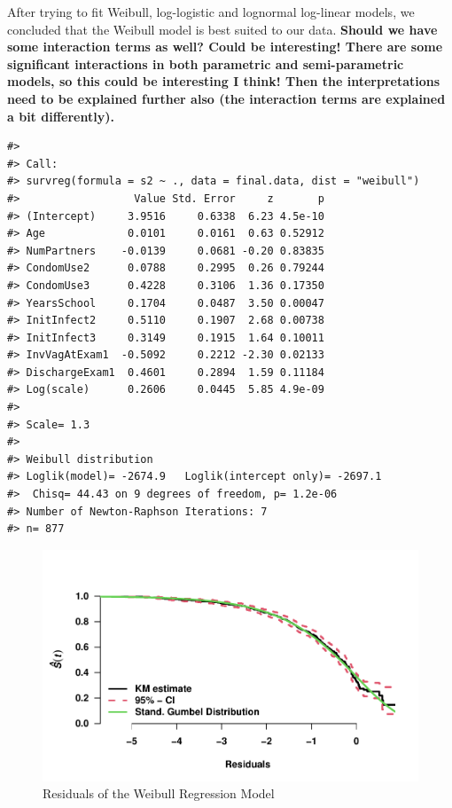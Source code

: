 \documentclass[
]{article}
\begin{document}
After trying to fit Weibull, log-logistic and lognormal log-linear models, we concluded that the Weibull model is best suited to our data.
\textbf{Should we have some interaction terms as well? Could be interesting! There are some significant interactions in both parametric and semi-parametric models, so this could be interesting I think! Then the interpretations need to be explained further also (the interaction terms are explained a bit differently).}

\begin{verbatim}
#> 
#> Call:
#> survreg(formula = s2 ~ ., data = final.data, dist = "weibull")
#>                  Value Std. Error     z       p
#> (Intercept)     3.9516     0.6338  6.23 4.5e-10
#> Age             0.0101     0.0161  0.63 0.52912
#> NumPartners    -0.0139     0.0681 -0.20 0.83835
#> CondomUse2      0.0788     0.2995  0.26 0.79244
#> CondomUse3      0.4228     0.3106  1.36 0.17350
#> YearsSchool     0.1704     0.0487  3.50 0.00047
#> InitInfect2     0.5110     0.1907  2.68 0.00738
#> InitInfect3     0.3149     0.1915  1.64 0.10011
#> InvVagAtExam1  -0.5092     0.2212 -2.30 0.02133
#> DischargeExam1  0.4601     0.2894  1.59 0.11184
#> Log(scale)      0.2606     0.0445  5.85 4.9e-09
#> 
#> Scale= 1.3 
#> 
#> Weibull distribution
#> Loglik(model)= -2674.9   Loglik(intercept only)= -2697.1
#>  Chisq= 44.43 on 9 degrees of freedom, p= 1.2e-06 
#> Number of Newton-Raphson Iterations: 7 
#> n= 877
\end{verbatim}

\begin{figure}
\centering
\includegraphics{practical_files/figure-latex/weibull-resids-1.pdf}
\caption{\label{fig:weibull-resids}Residuals of the Weibull Regression Model}
\end{figure}
\end{document}
